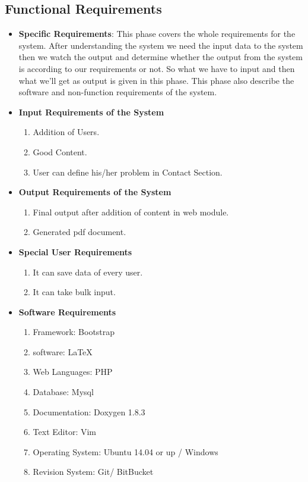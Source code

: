 \subsection{Functional Requirements}
\begin{itemize}
\item {\bf Specific Requirements}: This phase covers the whole requirements 
for the system. After understanding the system we need the input data 
to the system then we watch the output and determine whether the output 
from the system is according to our requirements or not. So what we have 
to input and then what we'll get as output is given in this phase. This 
phase also describe the software and non-function requirements of the 
system.
\item {\bf Input Requirements of the System}
\begin{enumerate} 
\item Addition of Users.
\item Good Content.
\item User can define his/her problem in Contact Section.
\end{enumerate}
\vskip 0.5cm
\item {\bf Output Requirements of the System}
\begin{enumerate} 
\item Final output after addition of content in web module.
\item Generated pdf document.
\end{enumerate}
\vskip 0.5cm
\item {\bf Special User Requirements}
\begin{enumerate} 
\item It can save data of every user.
\item It can take bulk input.
\end{enumerate}
\vskip 0.5cm
\item {\bf Software Requirements}
\begin{enumerate} 
\item Framework: Bootstrap
\item software: \LaTeX{}
\item Web Languages: PHP
\item Database: Mysql 
\item Documentation: Doxygen 1.8.3
\item Text Editor: Vim
\item Operating System: Ubuntu 14.04 or up / Windows
\item Revision System: Git/ BitBucket


\end{enumerate}
\end{itemize}
